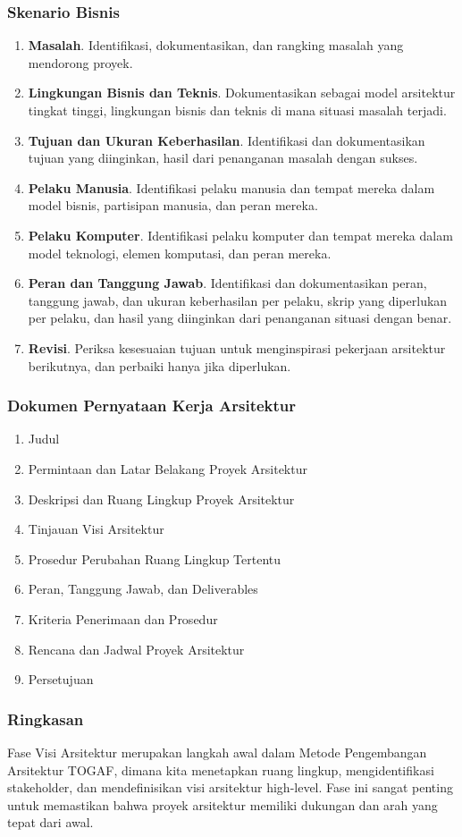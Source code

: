 \documentclass[aspectratio=169]{beamer}
\begin{document}
		\begin{frame}
			\frametitle{Skenario Bisnis}
			\begin{enumerate}
				\item \textbf{Masalah}.
				Identifikasi, dokumentasikan, dan rangking masalah yang mendorong proyek.
				\item \textbf{Lingkungan Bisnis dan Teknis}.
				Dokumentasikan sebagai model arsitektur tingkat tinggi, lingkungan bisnis dan teknis di mana situasi masalah terjadi.
				\item \textbf{Tujuan dan Ukuran Keberhasilan}.
				Identifikasi dan dokumentasikan tujuan yang diinginkan, hasil dari penanganan masalah dengan sukses.
				\item \textbf{Pelaku Manusia}.
				Identifikasi pelaku manusia dan tempat mereka dalam model bisnis, partisipan manusia, dan peran mereka.
				\item \textbf{Pelaku Komputer}.
				Identifikasi pelaku komputer dan tempat mereka dalam model teknologi, elemen komputasi, dan peran mereka.
				\item \textbf{Peran dan Tanggung Jawab}.
				Identifikasi dan dokumentasikan peran, tanggung jawab, dan ukuran keberhasilan per pelaku, skrip yang diperlukan per pelaku, dan hasil yang diinginkan dari penanganan situasi dengan benar.
				\item \textbf{Revisi}.
				Periksa kesesuaian tujuan untuk menginspirasi pekerjaan arsitektur berikutnya, dan perbaiki hanya jika diperlukan.
			\end{enumerate}
		\end{frame}
	
		\begin{frame}
			\frametitle{Dokumen Pernyataan Kerja Arsitektur}
			\begin{enumerate}
				\item Judul
				\item Permintaan dan Latar Belakang Proyek Arsitektur
				\item Deskripsi dan Ruang Lingkup Proyek Arsitektur
				\item Tinjauan Visi Arsitektur
				\item Prosedur Perubahan Ruang Lingkup Tertentu
				\item Peran, Tanggung Jawab, dan Deliverables
				\item Kriteria Penerimaan dan Prosedur
				\item Rencana dan Jadwal Proyek Arsitektur
				\item Persetujuan
			\end{enumerate}
		\end{frame}
	
	\begin{frame}
		\frametitle{Ringkasan}
		Fase Visi Arsitektur merupakan langkah awal dalam Metode Pengembangan Arsitektur TOGAF, dimana kita menetapkan ruang lingkup, mengidentifikasi stakeholder, dan mendefinisikan visi arsitektur high-level. Fase ini sangat penting untuk memastikan bahwa proyek arsitektur memiliki dukungan dan arah yang tepat dari awal.
	\end{frame}
	
\end{document}
